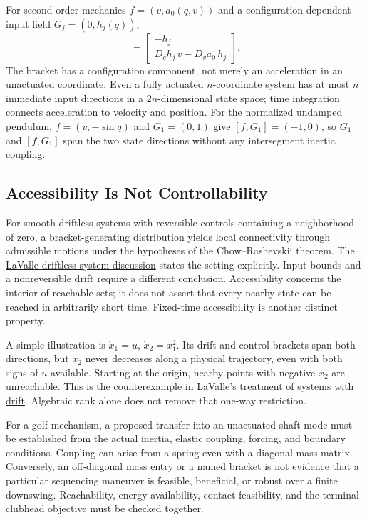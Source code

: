 For second-order mechanics $f=(v,a_0(q,v))$ and a configuration-dependent input field $G_j=(0,h_j(q))$,
\begin{equation}
[f,G_j]=\begin{bmatrix}-h_j\\D_qh_j\,v-D_va_0\,h_j\end{bmatrix}.
\end{equation}
The bracket has a configuration component, not merely an acceleration in an unactuated coordinate. Even a fully actuated $n$-coordinate system has at most $n$ immediate input directions in a $2n$-dimensional state space; time integration connects acceleration to velocity and position. For the normalized undamped pendulum, $f=(v,-\sin q)$ and $G_1=(0,1)$ give $[f,G_1]=(-1,0)$, so $G_1$ and $[f,G_1]$ span the two state directions without any intersegment inertia coupling.

\subsection{Accessibility Is Not Controllability}

For smooth driftless systems with reversible controls containing a neighborhood of zero, a bracket-generating distribution yields local connectivity through admissible motions under the hypotheses of the Chow--Rashevskii theorem. The \href{https://lavalle.pl/planning/node835.html}{LaValle driftless-system discussion} states the setting explicitly. Input bounds and a nonreversible drift require a different conclusion. Accessibility concerns the interior of reachable sets; it does not assert that every nearby state can be reached in arbitrarily short time. Fixed-time accessibility is another distinct property.

A simple illustration is $\dot x_1=u$, $\dot x_2=x_1^2$. Its drift and control brackets span both directions, but $x_2$ never decreases along a physical trajectory, even with both signs of $u$ available. Starting at the origin, nearby points with negative $x_2$ are unreachable. This is the counterexample in \href{https://lavalle.pl/planning/node836.html}{LaValle's treatment of systems with drift}. Algebraic rank alone does not remove that one-way restriction.

For a golf mechanism, a proposed transfer into an unactuated shaft mode must be established from the actual inertia, elastic coupling, forcing, and boundary conditions. Coupling can arise from a spring even with a diagonal mass matrix. Conversely, an off-diagonal mass entry or a named bracket is not evidence that a particular sequencing maneuver is feasible, beneficial, or robust over a finite downswing. Reachability, energy availability, contact feasibility, and the terminal clubhead objective must be checked together.

